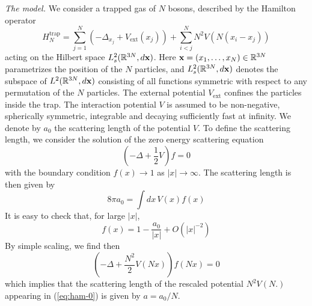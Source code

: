 \documentclass[11pt,a4paper]{article}
\newcommand{\bx}{{\bf x}}
\newcommand{\bR}{{\mathbb R}}
\begin{document}

\bigskip

{\it The model.} We consider a trapped gas of $N$ bosons, described by the Hamilton operator 
\begin{equation}\label{eq:ham-0}
H^{\text{trap}}_N = \sum_{j=1}^N \left(-\Delta_{x_j} +V_{\text{ext}} (x_j)\right) + \sum_{i<j}^N N^2 V (N (x_i - x_j)) 
\end{equation}
acting on the Hilbert space $L^2_s (\bR^{3N}, d\bx)$. Here $\bx = (x_1, \dots , x_N) \in \bR^{3N}$ parametrizes the position of the $N$ particles, and $L^2_s (\bR^{3N}, d\bx)$ denotes the subspace of $L^2 (\bR^{3N}, d\bx)$ consisting of all functions symmetric with respect to any permutation of the $N$ particles. The external potential $V_{\text{ext}}$ confines the particles inside the trap. The interaction potential $V$ is assumed to be non-negative, spherically symmetric,  integrable and decaying sufficiently fast at infinity. We denote by $a_0$ the scattering length of the potential $V$. To define the scattering length, we consider the solution of the zero energy scattering equation 
\begin{equation}\label{eq:0en-0} \left( -\Delta + \frac{1}{2} V \right) f = 0 \end{equation}
with the boundary condition $f (x) \to 1$ as $|x| \to \infty$. The scattering length is then given by 
\begin{equation}\label{eq:8pia} 8 \pi a_0 = \int dx \, V(x) f(x) \end{equation}
It is easy to check that, for large $|x|$, 
\begin{equation}\label{eq:f} f(x) = 1- \frac{a_0}{|x|} + O (|x|^{-2}) \end{equation}
By simple scaling, we find then
\[ \left( -\Delta + \frac{N^2}{2} V(N x) \right) f (Nx) = 0 \]
which implies that the scattering length of the rescaled potential $N^2 V(N.)$ appearing in (\ref{eq:ham-0}) is given by $a=a_0/N$. 

\bigskip
\end{document}
